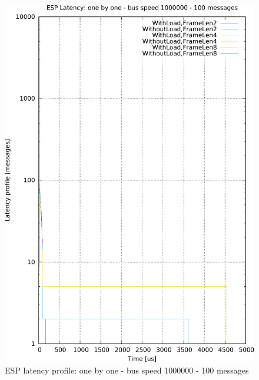 \documentclass{ctuthesis}
\begin{document}
\begin{figure}[htb]
\includegraphics[width=\linewidth]{figures/speed1000000_messages100_floodFalse.pdf}
\caption{ESP latency profile: one by one - bus speed 1000000 - 100 messages}
\end{figure}
\end{document}
